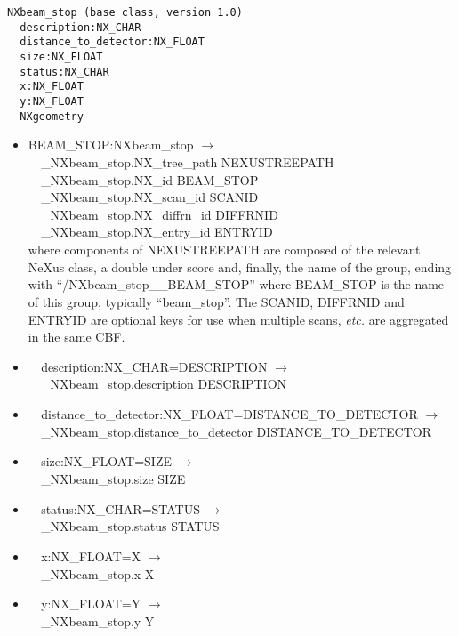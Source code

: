 \documentclass[11pt]{article}
\begin{document}
{{\begin{verbatim}
NXbeam_stop (base class, version 1.0)
  description:NX_CHAR
  distance_to_detector:NX_FLOAT
  size:NX_FLOAT
  status:NX_CHAR
  x:NX_FLOAT
  y:NX_FLOAT
  NXgeometry
\end{verbatim}

\begin{itemize}

\item{BEAM\_STOP:NXbeam\_stop $\rightarrow$\\
\verb|  |\_NXbeam\_stop.NX\_tree\_path    NEXUSTREEPATH \\
\verb|  |\_NXbeam\_stop.NX\_id            BEAM\_STOP\\
\verb|  |\_NXbeam\_stop.NX\_scan\_id      SCANID \\
\verb|  |\_NXbeam\_stop.NX\_diffrn\_id    DIFFRNID \\
\verb|  |\_NXbeam\_stop.NX\_entry\_id     ENTRYID \\
where components of NEXUSTREEPATH are composed of the
relevant NeXus class, a double under score and, finally, the
name of the group, ending with ``/NXbeam\_stop\_\_BEAM\_STOP''
where BEAM\_STOP is the name of this group, typically ``beam\_stop''.
The SCANID, DIFFRNID and ENTRYID are optional keys for use
when multiple scans, {\it etc.} are aggregated in the same CBF.}

\item{\verb|  |description:NX\_CHAR=DESCRIPTION $\rightarrow$\\
\verb|  |\_NXbeam\_stop.description DESCRIPTION}

\item{\verb|  |distance\_to\_detector:NX\_FLOAT=DISTANCE\_TO\_DETECTOR $\rightarrow$\\
\verb|  |\_NXbeam\_stop.distance\_to\_detector DISTANCE\_TO\_DETECTOR}

\item{\verb|  |size:NX\_FLOAT=SIZE $\rightarrow$\\
\verb|  |\_NXbeam\_stop.size SIZE}

\item{\verb|  |status:NX\_CHAR=STATUS $\rightarrow$\\
\verb|  |\_NXbeam\_stop.status STATUS}

\item{\verb|  |x:NX\_FLOAT=X $\rightarrow$\\
\verb|  |\_NXbeam\_stop.x X}

\item{\verb|  |y:NX\_FLOAT=Y $\rightarrow$\\
\verb|  |\_NXbeam\_stop.y Y}


\end{itemize}}}
\end{document}
